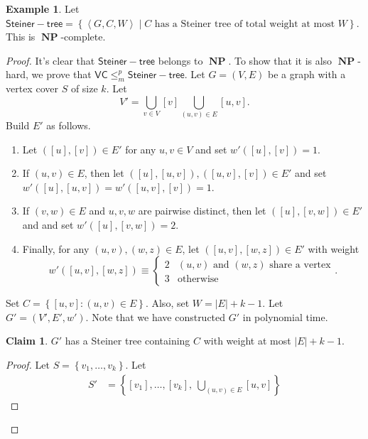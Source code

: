 \documentclass[10pt,letterpaper,cm]{nupset}
\theoremstyle{definition}
\newtheorem{exmp}[definition]{Example}
\theoremstyle{theorem}
\newtheorem*{claim}{Claim}
\theoremstyle{remark}
\newcommand{\1}{\mathbf{1}}
\newcommand{\0}{\vec 0}
\DeclareMathOperator{\NP}{\mathbf{NP}}
\begin{document}
\begin{exmp}
Let $\mathsf{Steiner{-}tree} = \left\{\left\langle G, C, W \right\rangle \mid C\text{ has a Steiner tree of total weight at most }W\right\}$. This is $\NP$-complete.
\end{exmp}
\begin{proof}
It's clear that $\mathsf{Steiner{-}tree} $ belongs to  $\NP$. To show that it is also $\NP$-hard, we prove that $\mathsf{VC} \leq_m^p \mathsf{Steiner{-}tree} $. Let $G = \left(V, E\right)$ be a graph with a vertex cover $S$ of size $k$. 
 Let $$V' = \bigcup_{v \in V} \left[v\right] \bigcup_{(u,v) \in E}\left[u,v\right].$$ Build $E'$ as follows. 
\begin{enumerate}[label=(\alph*)]
\item Let $\left(\left[u\right], \left[v\right]\right)\in E'$ for any $u,v \in V$ and set $w'(\left[u\right], \left[v\right])=1$. 
\item If $\left(u,v\right) \in E$, then let $\left(\left[u\right], \left[u,v\right]\right), \left(\left[u,v\right], \left[v\right]\right) \in E'$ and set $w'(\left[u\right], \left[u,v\right]) = w'(\left[u,v\right], \left[v\right]) =1$. 
\item If $\left(v,w\right) \in E$ and $u,v,w$ are pairwise distinct, then let $\left(\left[u\right], \left[v,w\right]\right) \in E'$ and and set $w'(\left[u\right], \left[v,w\right]) = 2$.
\item Finally, for any $\left(u,v\right), \left(w,z\right) \in E$, let $\left(\left[u,v\right], \left[w,z\right]\right)\in E'$  with weight $$w'\left(\left[u,v\right], \left[w,z\right]\right)\equiv \begin{cases} 2 & \left(u,v\right) \text{ and } \left(w,z\right) \text{ share a vertex} \\ 3 & \text{otherwise} \end{cases}.$$ 
\end{enumerate}
Set $C = \left\{ \left[u,v\right] : \left(u,v\right) \in E\right\}$. Also, set $W= \left\lvert{E}\right\rvert+ k -1$. Let $G' = \left(V', E', w'\right)$. Note that we have constructed $G'$ in polynomial time.
\begin{claim}
$G'$ has a Steiner tree containing $C$ with weight at most $\left\lvert{E}\right\rvert + k -1$.
\end{claim}
\begin{proof}
Let $S = \left\{v_1, \ldots, v_k\right\}$. Let 
\begin{align*}
S' & = \left\{\left[v_1\right], \ldots, \left[v_k\right], \ \bigcup_{\left(u,v\right) \in E}\left[u,v\right]\right\}

\end{align*}
\end{proof}
\end{proof}
\end{document}
